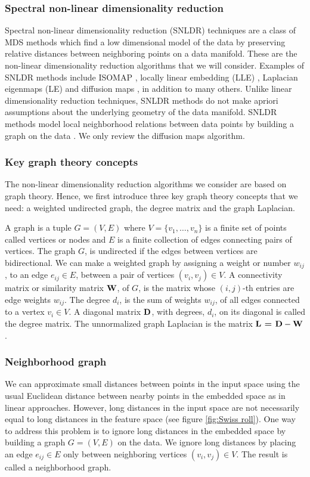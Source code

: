 \subsubsection{Spectral non-linear dimensionality reduction}
Spectral non-linear dimensionality reduction (SNLDR) techniques are a 
class of MDS  \linebreak[4] methods which find a low dimensional model of the data by preserving relative distances between neighboring points on a data manifold. These are the non-linear dimensionality reduction algorithms that we will consider. Examples of SNLDR methods include ISOMAP \cite{TenenbaumJB2000Aggf}, locally linear embedding (LLE)  \cite{roweis2000nonlinear}, Laplacian eigenmaps (LE) \cite{belkin2003laplacian} and diffusion maps \cite{coifman2006diffusion}, in addition to many others. Unlike linear dimensionality reduction techniques, SNLDR methods do not make apriori assumptions about the underlying geometry of the data manifold. SNLDR methods model local neighborhood relations between data points by building a graph on the data  \cite{Luxburg2007}. We only review the diffusion maps algorithm.


\subsubsection{Key graph theory concepts}
The non-linear dimensionality reduction algorithms we consider are based on graph theory. Hence, we first introduce three key graph theory concepts that we need: a weighted undirected graph, the degree matrix and the graph Laplacian.


A graph is a tuple $G = (V,E)$ where $V = \{v_1, \ldots , v_n\}$ is a finite set of points called vertices or nodes and $E$ is a finite collection of edges connecting pairs of vertices. The graph $G$, is undirected if the edges between vertices are bidirectional.
We can make a weighted graph by assigning a weight or number $w_{ij}$, to an edge $e_{ij} \in E$, between a pair of vertices $(v_i, v_j) \in V$. A connectivity matrix or similarity matrix $\textbf{W}$, of $G$, is the matrix whose $(i,j)$-th entries are edge weights $w_{ij}$.
The degree $d_i$, is the sum of weights $w_{ij}$, of all edges connected to a vertex $v_i \in V$.
A diagonal matrix $\textbf{D}$, with degrees, $d_{i}$, on its diagonal is called the degree matrix.
The unnormalized graph Laplacian is the  matrix $\textbf{L = D} - \textbf{W}$.


\subsubsection{Neighborhood graph}
We can approximate small distances between points in the input space using the usual Euclidean distance between nearby points in the embedded space as in linear approaches. However, long distances in the input space are not necessarily equal to long distances in the feature space (see figure \ref{fig:Swiss roll}). One way to address this problem is to ignore long distances in the embedded space by building a graph $G = (V, E)$ on the data. We ignore long distances by placing an edge $e_{ij} \in E$ only between neighboring vertices $(v_i, v_j) \in V$. The result is called 
a neighborhood graph.


